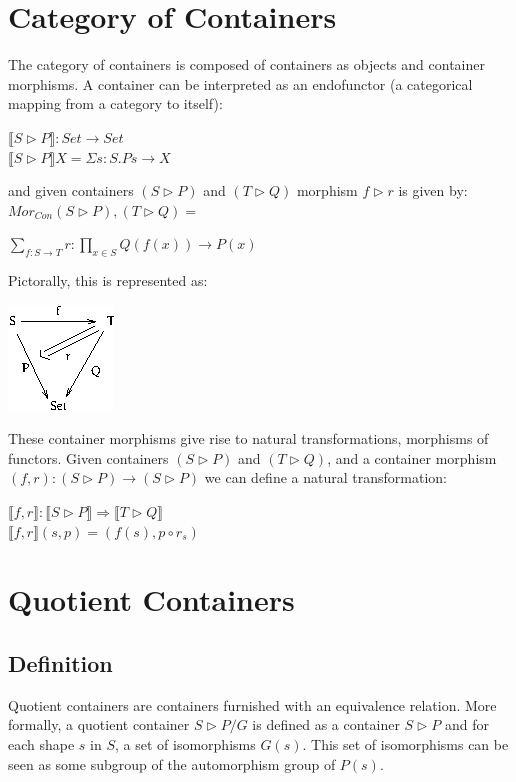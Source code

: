 \documentclass[12pt]{report}
\begin{document}
\section{Category of Containers}
The category of containers is composed of containers as objects and container morphisms.
A container can be interpreted as an endofunctor (a categorical mapping from a category to itself):
\begin{center}
$\llbracket S \rhd P\rrbracket : Set \to Set$\\
$ \llbracket S \rhd P\rrbracket X = \Sigma s : S. P s \to X $
\end{center}
and given containers $ (S \rhd P)$ and $ (T \rhd Q)$ morphism $ f \rhd r $ is given by:
\linebreak
\linebreak
$Mor_{Con}(S \rhd P),(T \rhd Q) = $
\begin{center}
$ \sum_{f : S \to T} r : \prod_{x \in S} Q(f(x)) \to P(x)$
\end{center}
Pictorally, this is represented as:
\begin{center}
\includegraphics[scale=1]{cm.png}
\end{center}
These container morphisms give rise to natural transformations, morphisms of functors. Given containers $ (S \rhd P)$ and $ (T \rhd Q)$, and a container morphism $ (f , r) : (S \rhd P) \to (S \rhd P)$ we can define a natural transformation:
\begin{center}
$ \llbracket f,r\rrbracket : \llbracket S \rhd P\rrbracket \Rightarrow \llbracket T \rhd Q\rrbracket$ \\
$  \llbracket f,r\rrbracket (s,p) = (f(s),p \circ r_s) $
\end{center}


\section{Quotient Containers}
\subsection{Definition}
Quotient containers are containers furnished with an equivalence relation. More formally, a quotient container $S \rhd P/G$ is defined as a container $S \rhd P$ and for each shape $s$ in $S$, a set of isomorphisms $G(s)$. This set of isomorphisms can be seen as some subgroup of the automorphism group of $P(s)$.
\end{document}
